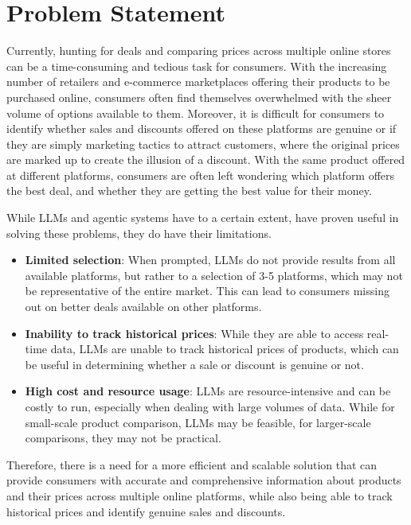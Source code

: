 \section{Problem Statement}\label{sec:problem-statement}

Currently, hunting for deals and comparing prices across multiple online stores can be a time-consuming and tedious task for consumers.
With the increasing number of retailers and e-commerce marketplaces offering their products to be purchased online, consumers often find themselves overwhelmed with the sheer volume of options available to them.
Moreover, it is difficult for consumers to identify whether sales and discounts offered on these platforms are genuine or if they are simply marketing tactics to attract customers, where the original prices are marked up to create the illusion of a discount.
With the same product offered at different platforms, consumers are often left wondering which platform offers the best deal, and whether they are getting the best value for their money.

While LLMs and agentic systems have to a certain extent, have proven useful in solving these problems, they do have their limitations.

\begin{itemize}
    \item \textbf{Limited selection}: When prompted, LLMs do not provide results from all available platforms, but rather to a selection of 3-5 platforms, which may not be representative of the entire market.
    This can lead to consumers missing out on better deals available on other platforms.
    \item \textbf{Inability to track historical prices}: While they are able to access real-time data, LLMs are unable to track historical prices of products, which can be useful in determining whether a sale or discount is genuine or not.
    \item \textbf{High cost and resource usage}: LLMs are resource-intensive and can be costly to run, especially when dealing with large volumes of data.
    While for small-scale product comparison, LLMs may be feasible, for larger-scale comparisons, they may not be practical.
\end{itemize}

Therefore, there is a need for a more efficient and scalable solution that can provide consumers with accurate and comprehensive information about products and their prices across multiple online platforms, while also being able to track historical prices and identify genuine sales and discounts.